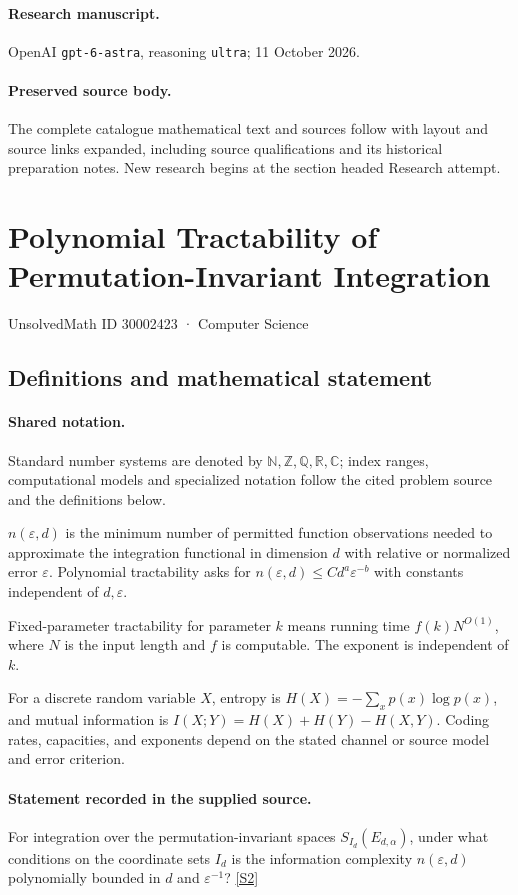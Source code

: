 \documentclass[11pt]{article}
\begin{document}
\paragraph{Research manuscript.} OpenAI \texttt{gpt-6-astra}, reasoning \texttt{ultra}; 11 October 2026.
\paragraph{Preserved source body.} The complete catalogue mathematical text and sources follow with layout and source links expanded, including source qualifications and its historical preparation notes. New research begins at the section headed Research attempt.

\section{Polynomial Tractability of Permutation-Invariant Integration}\label{30002423}
{\small UnsolvedMath ID 30002423 · Computer Science}
\subsection{Definitions and mathematical statement}

\paragraph{Shared notation.}Standard number systems are denoted by $\mathbb N,\mathbb Z,\mathbb Q,\mathbb R,\mathbb C$; index ranges, computational models and specialized notation follow the cited problem source and the definitions below.


$n(\varepsilon,d)$ is the minimum number of permitted function observations needed to approximate the integration functional in dimension $d$ with relative or normalized error $\varepsilon$. Polynomial tractability asks for $n(\varepsilon,d)\leq C d^a\varepsilon^{-b}$ with constants independent of $d,\varepsilon$.

Fixed-parameter tractability for parameter $k$ means running time $f(k)N^{O(1)}$, where $N$ is the input length and $f$ is computable. The exponent is independent of $k$.

For a discrete random variable $X$, entropy is $H(X)=-\sum_xp(x)\log p(x)$, and mutual information is $I(X;Y)=H(X)+H(Y)-H(X,Y)$. Coding rates, capacities, and exponents depend on the stated channel or source model and error criterion.
\paragraph{Statement recorded in the supplied source.}
For integration over the permutation-invariant spaces $S_{I_d}(E_{d,\alpha})$, under what conditions on the coordinate sets $I_d$ is the information complexity $n(\varepsilon,d)$ polynomially bounded in $d$ and $\varepsilon^{-1}$? \href{https://doi.org/10.4171/owr/2013/49}{[S2]}
\end{document}

